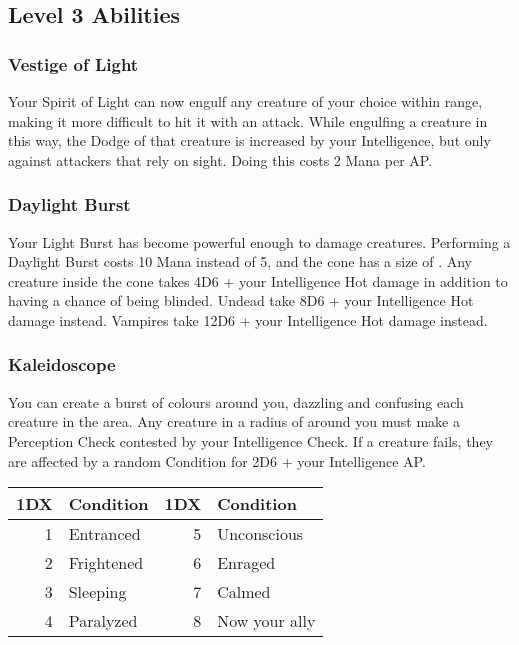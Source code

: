 \subsection{Level 3 Abilities}

\subsubsection{Vestige of Light}
Your Spirit of Light can now engulf any creature of your choice within range, making it more difficult to hit it with an attack. While engulfing a creature in this way, the Dodge of that creature is increased by your Intelligence, but only against attackers that rely on sight. Doing this costs 2 Mana per AP.

\subsubsection{Daylight Burst}
Your Light Burst has become powerful enough to damage creatures. Performing a Daylight Burst costs 10 Mana instead of 5, and the cone has a size of . Any creature inside the cone takes 4D6 + your Intelligence Hot damage in addition to having a chance of being blinded. Undead take 8D6 + your Intelligence Hot damage instead. Vampires take 12D6 + your Intelligence Hot damage instead.

\subsubsection{Kaleidoscope}
You can create a burst of colours around you, dazzling and confusing each creature in the area. Any creature in a radius of  around you must make a Perception Check contested by your Intelligence Check. If a creature fails, they are affected by a random Condition for 2D6 + your Intelligence AP.\\

\begin{longtable}{r | l || r | l}
	1DX & Condition & 1DX & Condition\\
	\hline
	1 & Entranced & 5 & Unconscious \\
	2 & Frightened & 6 & Enraged \\
	3 & Sleeping & 7 & Calmed\\
	4 & Paralyzed & 8 & Now your ally \\
\end{longtable}
\onecolumn